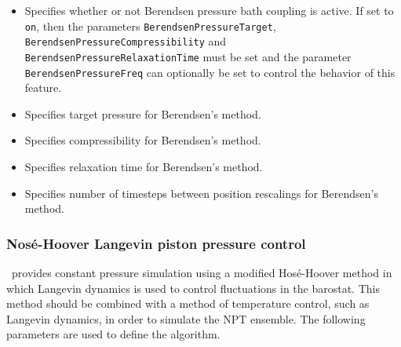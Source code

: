 \begin{itemize}

\item
{}
{Specifies whether or not Berendsen pressure bath coupling is active.  
If set to {\tt on}, then the parameters {\tt BerendsenPressureTarget}, {\tt BerendsenPressureCompressibility} and {\tt BerendsenPressureRelaxationTime} must be set 
and the parameter {\tt BerendsenPressureFreq} can
optionally be set to control the behavior of this feature.} 

\item
{}
{Specifies target pressure for Berendsen's method.}

\item
{}
{Specifies compressibility for Berendsen's method.}

\item
{}
{Specifies relaxation time for Berendsen's method.}

\item
{}
{Specifies number of timesteps between position rescalings for Berendsen's method.}

\end{itemize}

\subsubsection{Nos\'{e}-Hoover Langevin piston pressure control}

\NAMD\ provides constant pressure simulation using a modified Hos\'{e}-Hoover method in which Langevin dynamics is used to control fluctuations in the barostat.
This method should be combined with a method of temperature control, such as Langevin dynamics, in order to simulate the NPT ensemble.
The following parameters are used to define the algorithm.  

